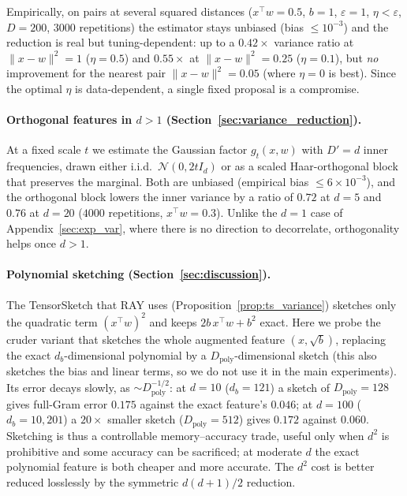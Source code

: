 \documentclass{article}
\begin{document}
\noindent Empirically, on pairs at several squared distances ($x^\top w=0.5$, $b=1$, $\varepsilon=1$, $\eta<\varepsilon$, $D=200$, $3000$ repetitions) the estimator stays unbiased (bias $\le10^{-3}$) and the reduction is real but tuning-dependent: up to a $0.42\times$ variance ratio at $\|x-w\|^2=1$ ($\eta=0.5$) and $0.55\times$ at $\|x-w\|^2=0.25$ ($\eta=0.1$), but \emph{no} improvement for the nearest pair $\|x-w\|^2=0.05$ (where $\eta=0$ is best). Since the optimal $\eta$ is data-dependent, a single fixed proposal is a compromise.

\paragraph{Orthogonal features in $d>1$ (Section~\ref{sec:variance_reduction}).} At a fixed scale $t$ we estimate the Gaussian factor $g_t(x,w)$ with $D'=d$ inner frequencies, drawn either i.i.d.\ $\mathcal{N}(0,2tI_d)$ or as a scaled Haar-orthogonal block \citep{yu2016orthogonal} that preserves the marginal. Both are unbiased (empirical bias $\le6\times10^{-3}$), and the orthogonal block lowers the inner variance by a ratio of $0.72$ at $d=5$ and $0.76$ at $d=20$ ($4000$ repetitions, $x^\top w=0.3$). Unlike the $d=1$ case of Appendix~\ref{sec:exp_var}, where there is no direction to decorrelate, orthogonality helps once $d>1$.

\paragraph{Polynomial sketching (Section~\ref{sec:discussion}).} The TensorSketch that RAY uses (Proposition~\ref{prop:ts_variance}) sketches only the quadratic term $(x^\top w)^2$ and keeps $2b\,x^\top w+b^2$ exact. Here we probe the cruder variant that sketches the whole augmented feature $(x,\sqrt b)$, replacing the exact $d_b$-dimensional polynomial by a $D_{\mathrm{poly}}$-dimensional sketch (this also sketches the bias and linear terms, so we do not use it in the main experiments). Its error decays slowly, as $\sim D_{\mathrm{poly}}^{-1/2}$: at $d=10$ ($d_b=121$) a sketch of $D_{\mathrm{poly}}=128$ gives full-Gram error $0.175$ against the exact feature's $0.046$; at $d=100$ ($d_b=10{,}201$) a $20\times$ smaller sketch ($D_{\mathrm{poly}}=512$) gives $0.172$ against $0.060$. Sketching is thus a controllable memory--accuracy trade, useful only when $d^2$ is prohibitive and some accuracy can be sacrificed; at moderate $d$ the exact polynomial feature is both cheaper and more accurate. The $d^2$ cost is better reduced losslessly by the symmetric $d(d{+}1)/2$ reduction.
\end{document}
